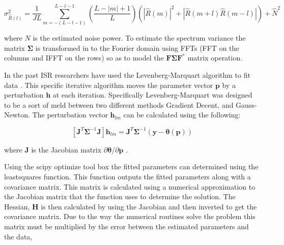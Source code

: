 \documentclass[draft,ras]{agutex}
\begin{document}
\begin{article}
\begin{equation}
\label{eqn:acfvar}
\sigma_{\hat{R}(l)}^2=\frac{1}{JL}\displaystyle \sum_{m=-(L-l-1)}^{L-l-1}\left(\frac{L-|m|+1}{L}\right)\left(|\hat{R}(m)|^2 +|\hat{R}(m+l)\hat{R}(m-l)|\right) + \hat{N}^2
\end{equation}

\noindent where $N$ is the estimated noise power. To estimate the spectrum variance the matrix $\bm{\Sigma}$ is transformed in to the Fourier domain using FFTs (FFT on the columns and IFFT on the rows) so as to model the $\mathbf{F}\bm{\Sigma} \mathbf{F}^*$ matrix operation. 






In the past ISR researchers have used the Levenberg-Marquart algorithm to fit data \citep{nikoukar2008}.  This specific iterative algorithm moves the parameter vector $\mathbf{p}$ by a perturbation $\mathbf{h}$ at each iteration\citep{gavin:2013}.  Specifically Levenberg-Marquart was designed to be a sort of meld between two different methods Gradient Decent, and Gauss-Newton.  The perturbation vector $\mathbf{h}_{lm}$ can be calculated using the following:

\begin{equation}
\left[ \mathbf{J}^T\bm{\Sigma}^{-1}\mathbf{J}\right]\mathbf{h}_{lm} =\mathbf{J}^T\bm{\Sigma}^{-1}(\mathbf{y}-\bm{\theta}(\mathbf{p}))
\label{hlm}
\end{equation}

\noindent where $\mathbf{J}$ is the Jacobian matrix $\partial \bm{\theta}/\partial \mathbf{p}$ \citep{levenberg1944,marquardt:1963}. 

Using the scipy optimize tool box the fitted parameters can determined using the leastsquares function. This function outputs the fitted parameters along with a covariance matrix. This matrix is calculated using a numerical approximation to the Jacobian matrix that the function uses to determine the solution. The Hessian, $\mathbf{H}$ is then calculated by using the Jacobian and then inverted to get the covariance matrix. Due to the way the numerical routines solve the problem this matrix must be multiplied by the error between the estimated parameters and the data,


\end{article}
\end{document}
